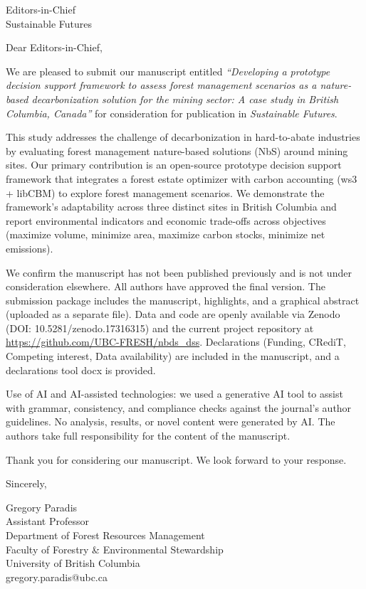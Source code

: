 \documentclass[12pt]{letter}
\date{\today}
\begin{document}
\begin{letter}{Editors-in-Chief\\Sustainable Futures}

\opening{Dear Editors-in-Chief,}

We are pleased to submit our manuscript entitled \textit{``Developing a prototype decision support framework to assess forest management scenarios as a nature-based decarbonization solution for the mining sector: A case study in British Columbia, Canada''} for consideration for publication in \textit{Sustainable Futures}.

This study addresses the challenge of decarbonization in hard-to-abate industries by evaluating forest management nature-based solutions (NbS) around mining sites. Our primary contribution is an open-source prototype decision support framework that integrates a forest estate optimizer with carbon accounting (ws3 + libCBM) to explore forest management scenarios. We demonstrate the framework's adaptability across three distinct sites in British Columbia and report environmental indicators and economic trade-offs across objectives (maximize volume, minimize area, maximize carbon stocks, minimize net emissions).

We confirm the manuscript has not been published previously and is not under consideration elsewhere. All authors have approved the final version. The submission package includes the manuscript, highlights, and a graphical abstract (uploaded as a separate file). Data and code are openly available via Zenodo (DOI: 10.5281/zenodo.17316315) and the current project repository at \url{https://github.com/UBC-FRESH/nbds_dss}. Declarations (Funding, CRediT, Competing interest, Data availability) are included in the manuscript, and a declarations tool docx is provided.

Use of AI and AI-assisted technologies: we used a generative AI tool to assist with grammar, consistency, and compliance checks against the journal's author guidelines. No analysis, results, or novel content were generated by AI. The authors take full responsibility for the content of the manuscript.

Thank you for considering our manuscript. We look forward to your response.

Sincerely,

\vspace{1em}
\noindent
Gregory Paradis\\
Assistant Professor\\
Department of Forest Resources Management\\
Faculty of Forestry \& Environmental Stewardship\\
University of British Columbia\\
gregory.paradis@ubc.ca

\end{letter}
\end{document}
